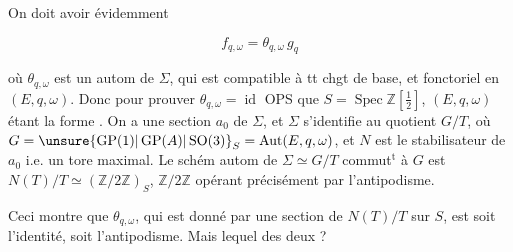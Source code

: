 

On doit avoir évidemment

\[
f_{q,\omega}=\theta_{q,\omega}\,g_q
\]

où $\theta_{q,\omega}$ est un autom de $\Sigma$, qui est compatible à tt chgt de base, et fonctoriel en $(E,q,\omega)$. Donc pour prouver $\theta_{q,\omega}=\operatorname{id}$ OPS que $S=\operatorname{Spec}\mathbb Z[\frac12]$, $(E,q,\omega)$ étant la forme . On a une section $a_0$ de $\Sigma$, et $\Sigma$ s'identifie au quotient $G/T$, où $G={\unsure{\operatorname{GP}(1)|\operatorname{GP}(A)|\operatorname{SO}(3)}}_S=\operatorname{Aut}(E,q,\omega)$, et $N$ est le stabilisateur de $a_0$ i.e. un tore maximal. Le schém  autom de $\Sigma\simeq G/T$ commut$^{\mathrm t}$ à $G$ est $N(T)/T\simeq(\mathbb Z/2\mathbb Z)_S$, $\mathbb Z/2\mathbb Z$ opérant précisément par l'antipodisme.

Ceci montre que $\theta_{q,\omega}$, qui est donné par une section de $N(T)/T$ sur $S$, est soit l'identité, soit l'antipodisme. Mais lequel des deux ?

